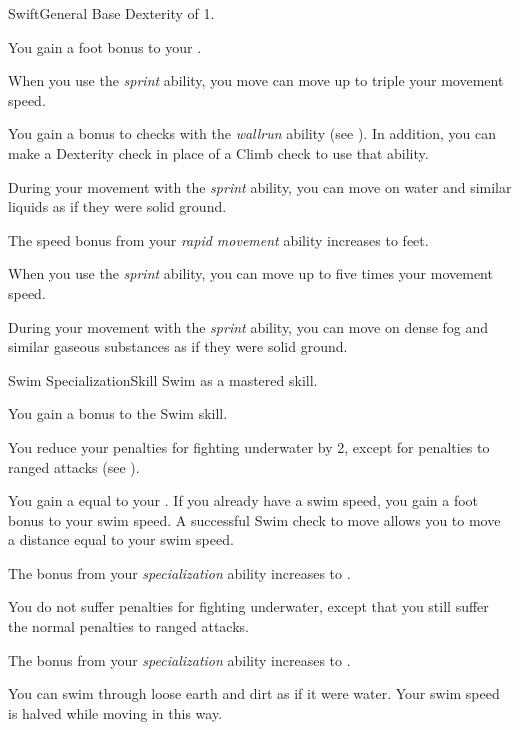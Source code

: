     \begin{feat}{Swift}{General}
        \featpre Base Dexterity of 1.

         You gain a  foot bonus to your .

         When you use the \textit{sprint} ability, you move can move up to triple your movement speed.

         You gain a  bonus to checks with the \textit{wallrun} ability (see ).
        In addition, you can make a Dexterity check in place of a Climb check to use that ability.

         During your movement with the \textit{sprint} ability, you can move on water and similar liquids as if they were solid ground.

         The speed bonus from your \textit{rapid movement} ability increases to  feet.

         When you use the \textit{sprint} ability, you can move up to five times your movement speed.

         During your movement with the \textit{sprint} ability, you can move on dense fog and similar gaseous substances as if they were solid ground.
    \end{feat}

    \begin{feat}{Swim Specialization}{Skill}
        \featpre Swim as a mastered skill.

         You gain a  bonus to the Swim skill.

         You reduce your penalties for fighting underwater by 2, except for penalties to  ranged attacks (see ).

         You gain a  equal to your .
        If you already have a swim speed, you gain a  foot bonus to your swim speed.
        A successful Swim check to move allows you to move a distance equal to your swim speed.

         The bonus from your \textit{specialization} ability increases to .

         You do not suffer penalties for fighting underwater, except that you still suffer the normal penalties to  ranged attacks.

         The bonus from your \textit{specialization} ability increases to .

         You can swim through loose earth and dirt as if it were water.
        Your swim speed is halved while moving in this way.
    \end{feat}

